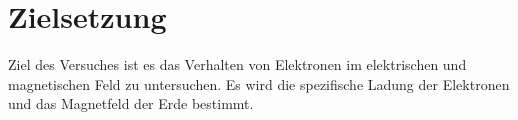 
\section{Zielsetzung}
\label{sec:Zielsetzung}

Ziel des Versuches ist es das Verhalten von Elektronen im elektrischen und magnetischen Feld zu untersuchen. Es wird die spezifische Ladung der Elektronen und das Magnetfeld der Erde bestimmt.
